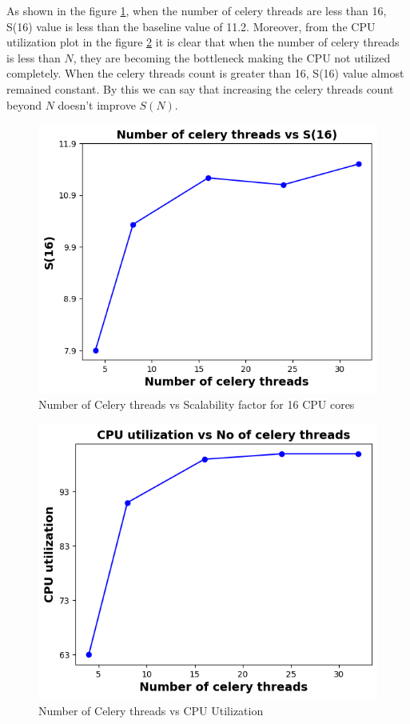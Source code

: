 \documentclass{iitbreport}
\begin{document}
As shown in the figure \ref{celery_plot}, when the number of celery threads are less than 16, S(16) value is less than the baseline value of 11.2. Moreover, from the CPU utilization plot in the figure \ref{celery_cpuutil} it is clear that  when the number of celery threads is less than $N$, they are becoming the bottleneck  making the CPU not utilized completely. When the celery threads count is greater than 16, S(16) value almost remained constant. By this we can say that increasing the celery threads count beyond $N$ doesn't improve $S(N)$.
\begin{figure}[!htb]
  \centering
  \includegraphics[width=\linewidth]{Images/celery_threads_scalability.png}
  \caption{Number of Celery threads vs Scalability factor for 16 CPU cores}
  \label{celery_plot}
\end{figure}

\begin{figure}[!htb]
  \centering
  \includegraphics[width=\linewidth]{Images/celery_threads_utilization.png}
  \caption{Number of Celery threads vs CPU Utilization}
  \label{celery_cpuutil}
\end{figure}
\end{document}

